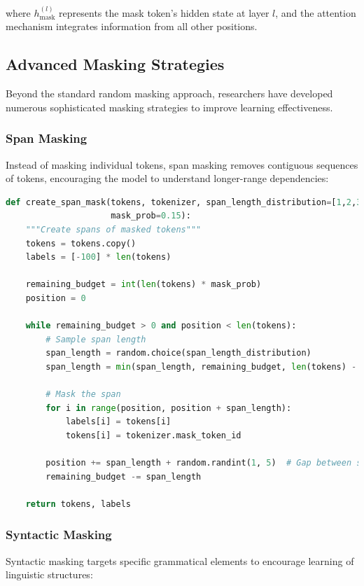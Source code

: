 where $h_{\text{mask}}^{(l)}$ represents the mask token's hidden state at layer $l$, and the attention mechanism integrates information from all other positions.

\subsection{Advanced Masking Strategies}

Beyond the standard random masking approach, researchers have developed numerous sophisticated masking strategies to improve learning effectiveness.

\subsubsection{Span Masking}

Instead of masking individual tokens, span masking removes contiguous sequences of tokens, encouraging the model to understand longer-range dependencies:

\begin{lstlisting}[language=Python, caption=Span masking implementation]
def create_span_mask(tokens, tokenizer, span_length_distribution=[1,2,3,4,5], 
                     mask_prob=0.15):
    """Create spans of masked tokens"""
    tokens = tokens.copy()
    labels = [-100] * len(tokens)
    
    remaining_budget = int(len(tokens) * mask_prob)
    position = 0
    
    while remaining_budget > 0 and position < len(tokens):
        # Sample span length
        span_length = random.choice(span_length_distribution)
        span_length = min(span_length, remaining_budget, len(tokens) - position)
        
        # Mask the span
        for i in range(position, position + span_length):
            labels[i] = tokens[i]
            tokens[i] = tokenizer.mask_token_id
        
        position += span_length + random.randint(1, 5)  # Gap between spans
        remaining_budget -= span_length
    
    return tokens, labels
\end{lstlisting}

\subsubsection{Syntactic Masking}

Syntactic masking targets specific grammatical elements to encourage learning of linguistic structures:

